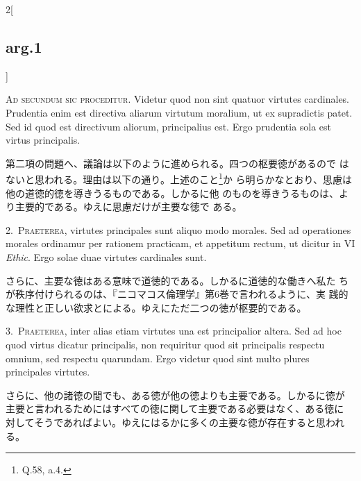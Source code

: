 \documentclass[paper=a4paper,fontsize=10pt,jafontsize=9pt,titlepage]{jlreq}
\begin{document}
\begin{paracol}{2}[\subsection{arg.1}]

{\scshape Ad secundum sic proceditur}. Videtur quod non sint quatuor
virtutes cardinales. Prudentia enim est directiva aliarum virtutum
moralium, ut ex supradictis patet. Sed id quod est directivum aliorum,
principalius est. Ergo prudentia sola est virtus principalis.

\switchcolumn

第二項の問題へ、議論は以下のように進められる。四つの枢要徳があるので
 はないと思われる。理由は以下の通り。上述のこと\footnote{Q.58, a.4.}か
 ら明らかなとおり、思慮は他の道徳的徳を導きうるものである。しかるに他
 のものを導きうるものは、より主要的である。ゆえに思慮だけが主要な徳で
 ある。


2.~{\scshape Praeterea}, virtutes principales sunt aliquo modo
morales. Sed ad operationes morales ordinamur per rationem practicam,
et appetitum rectum, ut dicitur in VI {\itshape Ethic}. Ergo solae
duae virtutes cardinales sunt.

\switchcolumn

さらに、主要な徳はある意味で道徳的である。しかるに道徳的な働きへ私た
 ちが秩序付けられるのは、『ニコマコス倫理学』第6巻で言われるように、実
 践的な理性と正しい欲求とによる。ゆえにただ二つの徳が枢要的である。


3.~{\scshape Praeterea}, inter alias etiam virtutes una est
principalior altera. Sed ad hoc quod virtus dicatur principalis, non
requiritur quod sit principalis respectu omnium, sed respectu
quarundam. Ergo videtur quod sint multo plures principales virtutes.

\switchcolumn

さらに、他の諸徳の間でも、ある徳が他の徳よりも主要である。しかるに徳が
主要と言われるためにはすべての徳に関して主要である必要はなく、ある徳に
対してそうであればよい。ゆえにはるかに多くの主要な徳が存在すると思われ
る。


\end{paracol}
\end{document}
